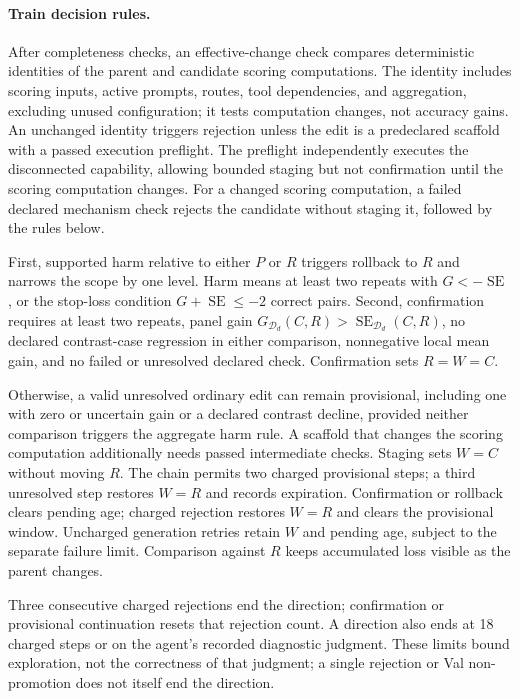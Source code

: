 \paragraph{Train decision rules.}
\label{app:direction-decisions}
After completeness checks, an effective-change check compares deterministic identities of the parent and candidate scoring computations.
The identity includes scoring inputs, active prompts, routes, tool dependencies, and aggregation, excluding unused configuration; it tests computation changes, not accuracy gains.
An unchanged identity triggers rejection unless the edit is a predeclared scaffold with a passed execution preflight.
The preflight independently executes the disconnected capability, allowing bounded staging but not confirmation until the scoring computation changes.
For a changed scoring computation, a failed declared mechanism check rejects the candidate without staging it, followed by the rules below.

First, supported harm relative to either $P$ or $R$ triggers rollback to $R$ and narrows the scope by one level.
Harm means at least two repeats with $G<-\operatorname{SE}$, or the stop-loss condition $G+\operatorname{SE}\leq-2$ correct pairs.
Second, confirmation requires at least two repeats, panel gain $G_{\mathcal D_d}(C,R)>\operatorname{SE}_{\mathcal D_d}(C,R)$, no declared contrast-case regression in either comparison, nonnegative local mean gain, and no failed or unresolved declared check.
Confirmation sets $R=W=C$.

Otherwise, a valid unresolved ordinary edit can remain provisional, including one with zero or uncertain gain or a declared contrast decline, provided neither comparison triggers the aggregate harm rule.
A scaffold that changes the scoring computation additionally needs passed intermediate checks.
Staging sets $W=C$ without moving $R$.
The chain permits two charged provisional steps; a third unresolved step restores $W=R$ and records expiration.
Confirmation or rollback clears pending age; charged rejection restores $W=R$ and clears the provisional window.
Uncharged generation retries retain $W$ and pending age, subject to the separate failure limit.
Comparison against $R$ keeps accumulated loss visible as the parent changes.

Three consecutive charged rejections end the direction; confirmation or provisional continuation resets that rejection count.
A direction also ends at 18 charged steps or on the agent's recorded diagnostic judgment.
These limits bound exploration, not the correctness of that judgment; a single rejection or Val non-promotion does not itself end the direction.

